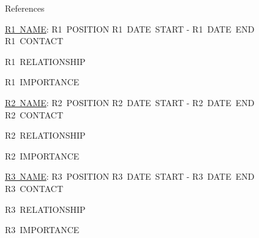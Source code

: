 \documentclass{resume} %
\begin{document}
  \begin{rSection}{References}

    \begin{rSubsection}{\underline{R1~NAME}: R1~POSITION }{ R1~DATE~START - R1~DATE~END }{R1~CONTACT}

      \item R1~RELATIONSHIP

      \item R1~IMPORTANCE

    \end{rSubsection}

    \begin{rSubsection}{\underline{R2~NAME}: R2~POSITION }{ R2~DATE~START - R2~DATE~END }{R2~CONTACT}

      \item R2~RELATIONSHIP

      \item R2~IMPORTANCE

    \end{rSubsection}

    \begin{rSubsection}{\underline{R3~NAME}: R3~POSITION }{ R3~DATE~START - R3~DATE~END }{R3~CONTACT}

      \item R3~RELATIONSHIP

      \item R3~IMPORTANCE

    \end{rSubsection}

  \end{rSection}
\end{document}
